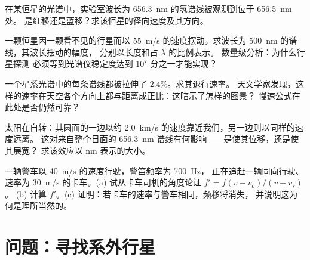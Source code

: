\begin{exercise}[$\star\star$]\label{exo:g12:doppler-effect:11}
在某恒星的光谱中，实验室波长为 \qty{656.3}{nm} 的氢谱线被观测到位于 \qty{656.5}{nm} 处。
是红移还是蓝移？求该恒星的径向速度及其方向。
\end{exercise}

\begin{exercise}[$\star\star\star$]\label{exo:g12:doppler-effect:12}
一颗恒星因一颗看不见的行星而以 \qty{55}{m/s} 的速度摆动。求波长为 \qty{500}{nm} 的谱线，其波长摆动的幅度，
分别以长度和占 $\lambda$ 的比例表示。
数量级分析：为什么行星探测
必须等到光谱仪稳定度达到 $10^{7}$ 分之一才能实现？
\end{exercise}

\begin{exercise}[$\star\star\star$]\label{exo:g12:doppler-effect:13}
一个星系光谱中的每条谱线都被拉伸了 $2.4\%$。求其退行速率。
天文学家发现，这样的速率在天空各个方向上都与距离成正比：这暗示了怎样的图景？
慢速公式在此处是否仍然可靠？
\end{exercise}

\begin{exercise}[$\star\star\star$]\label{exo:g12:doppler-effect:14}
太阳在自转：其圆面的一边以约 \qty{2.0}{km/s} 的速度靠近我们，另一边则以同样的速度远离。
这对来自整个日面的 \qty{656.3}{nm} 谱线有何影响——是使其位移，还是使其展宽？
求该效应以 \unit{nm} 表示的大小。
\end{exercise}

\begin{exercise}[$\star\star\star$]\label{exo:g12:doppler-effect:15}
一辆警车以 \qty{40}{m/s} 的速度行驶，警笛频率为 \qty{700}{Hz}，
正在追赶一辆同向行驶、速率为 \qty{30}{m/s} 的卡车。(a) 试从卡车司机的角度论证 $f' = f(v - v_o)/(v - v_s)$。
(b) 计算 $f'$。(c) 证明：若卡车的速率与警车相同，频移将消失，
并说明这为何是理所当然的。
\end{exercise}

\section{问题：寻找系外行星}

